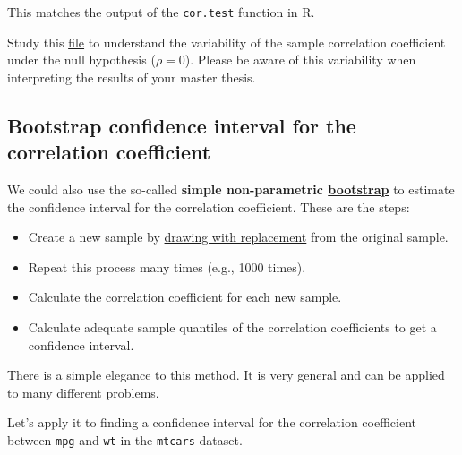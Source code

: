 \documentclass[
]{book}
\newenvironment{Shaded}{\begin{snugshade}}{\end{snugshade}}
\newcommand{\AttributeTok}[1]{\textcolor[rgb]{0.13,0.29,0.53}{#1}}
\newcommand{\CommentTok}[1]{\textcolor[rgb]{0.56,0.35,0.01}{\textit{#1}}}
\newcommand{\ConstantTok}[1]{\textcolor[rgb]{0.56,0.35,0.01}{#1}}
\newcommand{\DecValTok}[1]{\textcolor[rgb]{0.00,0.00,0.81}{#1}}
\newcommand{\FunctionTok}[1]{\textcolor[rgb]{0.13,0.29,0.53}{\textbf{#1}}}
\newcommand{\NormalTok}[1]{#1}
\newcommand{\OtherTok}[1]{\textcolor[rgb]{0.56,0.35,0.01}{#1}}
\newcommand{\SpecialCharTok}[1]{\textcolor[rgb]{0.81,0.36,0.00}{\textbf{#1}}}
\providecommand{\tightlist}{%
  \setlength{\itemsep}{0pt}\setlength{\parskip}{0pt}}
\begin{document}
This matches the output of the \texttt{cor.test} function in R.

Study this \href{https://github.com/jdegenfellner/ZHAW_Teaching/blob/main/Variability_of_Correlation_under_H_0.R}{file}
to understand the variability of the sample correlation coefficient under the null hypothesis (\(\rho=0\)).
Please be aware of this variability when interpreting the results of your master thesis.

\subsection{Bootstrap confidence interval for the correlation coefficient}\label{bootstrap-confidence-interval-for-the-correlation-coefficient}

We could also use the so-called \textbf{simple non-parametric \href{https://en.wikipedia.org/wiki/Bootstrapping_(statistics)}{bootstrap}} to estimate the confidence interval for the correlation coefficient.
These are the steps:

\begin{itemize}
\tightlist
\item
  Create a new sample by \href{https://upload.wikimedia.org/wikipedia/commons/4/4a/Illustration_bootstrap.svg}{drawing with replacement} from the original sample.
\item
  Repeat this process many times (e.g., 1000 times).
\item
  Calculate the correlation coefficient for each new sample.
\item
  Calculate adequate sample quantiles of the correlation coefficients to get a confidence interval.
\end{itemize}

There is a simple elegance to this method. It is very general and can be applied to many different problems.

Let's apply it to finding a confidence interval for the correlation coefficient between \texttt{mpg} and \texttt{wt} in the \texttt{mtcars} dataset.

\begin{Shaded}
\end{Shaded}
\end{document}
